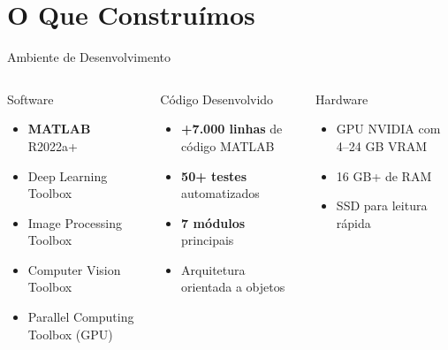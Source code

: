 \documentclass[aspectratio=169, 12pt]{beamer}
\begin{document}
\section{O Que Construímos}

\begin{frame}{Ambiente de Desenvolvimento}
    \begin{columns}[T]
        \begin{block}{\faCogs\hspace{0.2cm} Software}
            \begin{itemize}
                \item \textbf{MATLAB} R2022a+
                \item Deep Learning Toolbox
                \item Image Processing Toolbox
                \item Computer Vision Toolbox
                \item Parallel Computing Toolbox (GPU)
            \end{itemize}
        \end{block}

        \vspace{0.2cm}

        \begin{block}{\faCode\hspace{0.2cm} Código Desenvolvido}
            \begin{itemize}
                \item \textbf{+7.000 linhas} de código MATLAB
                \item \textbf{50+ testes} automatizados
                \item \textbf{7 módulos} principais
                \item Arquitetura orientada a objetos
            \end{itemize}
        \end{block}

        \begin{block}{\faServer\hspace{0.2cm} Hardware}
            \begin{itemize}
                \item GPU NVIDIA com 4--24 GB VRAM
                \item 16 GB+ de RAM
                \item SSD para leitura rápida
            \end{itemize}
        \end{block}


\end{columns}
\end{frame}
\end{document}
